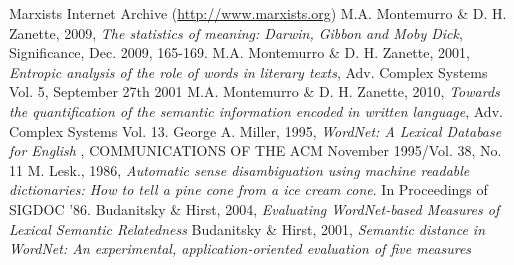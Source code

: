 \documentclass{pnastwo}
\begin{document}
\begin{article}
\begin{thebibliography}{10}
Marxists Internet Archive (\url{http://www.marxists.org})
M.A. Montemurro \& D. H. Zanette, 2009, {\em The statistics of meaning: Darwin, Gibbon and Moby Dick}, Significance, Dec. 2009, 165-169.
M.A. Montemurro \& D. H. Zanette, 2001, {\em Entropic analysis of the role of words in literary texts}, Adv. Complex Systems Vol. 5, September 27th 2001
M.A. Montemurro \& D. H. Zanette, 2010, {\em Towards the quantification of the semantic information encoded in written language}, Adv. Complex Systems Vol. 13.
George A. Miller, 1995, {\em WordNet: A Lexical Database for English }, COMMUNICATIONS OF THE ACM November 1995/Vol. 38, No. 11
M. Lesk., 1986, {\em Automatic sense disambiguation using machine readable dictionaries: How to tell a pine cone from a ice cream cone}. In Proceedings of SIGDOC ’86.
Budanitsky \& Hirst, 2004, {\em Evaluating WordNet-based Measures of Lexical Semantic Relatedness}
Budanitsky \& Hirst, 2001, {\em Semantic distance in WordNet: An experimental, application-oriented evaluation of five measures}
\end{thebibliography}


\end{article}
\end{document}
